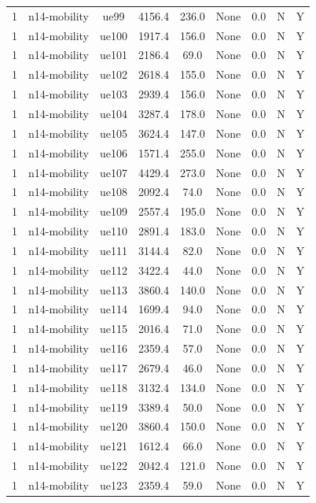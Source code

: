 \begin{table}[ht]
\begin{tabular}{|c|c|c|c|c|c|c|c|c|}
1 & n14-mobility & ue99 & 4156.4 & 236.0 & None & 0.0 & N & Y \\
1 & n14-mobility & ue100 & 1917.4 & 156.0 & None & 0.0 & N & Y \\
1 & n14-mobility & ue101 & 2186.4 & 69.0 & None & 0.0 & N & Y \\
1 & n14-mobility & ue102 & 2618.4 & 155.0 & None & 0.0 & N & Y \\
1 & n14-mobility & ue103 & 2939.4 & 156.0 & None & 0.0 & N & Y \\
1 & n14-mobility & ue104 & 3287.4 & 178.0 & None & 0.0 & N & Y \\
1 & n14-mobility & ue105 & 3624.4 & 147.0 & None & 0.0 & N & Y \\
1 & n14-mobility & ue106 & 1571.4 & 255.0 & None & 0.0 & N & Y \\
1 & n14-mobility & ue107 & 4429.4 & 273.0 & None & 0.0 & N & Y \\
1 & n14-mobility & ue108 & 2092.4 & 74.0 & None & 0.0 & N & Y \\
1 & n14-mobility & ue109 & 2557.4 & 195.0 & None & 0.0 & N & Y \\
1 & n14-mobility & ue110 & 2891.4 & 183.0 & None & 0.0 & N & Y \\
1 & n14-mobility & ue111 & 3144.4 & 82.0 & None & 0.0 & N & Y \\
1 & n14-mobility & ue112 & 3422.4 & 44.0 & None & 0.0 & N & Y \\
1 & n14-mobility & ue113 & 3860.4 & 140.0 & None & 0.0 & N & Y \\
1 & n14-mobility & ue114 & 1699.4 & 94.0 & None & 0.0 & N & Y \\
1 & n14-mobility & ue115 & 2016.4 & 71.0 & None & 0.0 & N & Y \\
1 & n14-mobility & ue116 & 2359.4 & 57.0 & None & 0.0 & N & Y \\
1 & n14-mobility & ue117 & 2679.4 & 46.0 & None & 0.0 & N & Y \\
1 & n14-mobility & ue118 & 3132.4 & 134.0 & None & 0.0 & N & Y \\
1 & n14-mobility & ue119 & 3389.4 & 50.0 & None & 0.0 & N & Y \\
1 & n14-mobility & ue120 & 3860.4 & 150.0 & None & 0.0 & N & Y \\
1 & n14-mobility & ue121 & 1612.4 & 66.0 & None & 0.0 & N & Y \\
1 & n14-mobility & ue122 & 2042.4 & 121.0 & None & 0.0 & N & Y \\
1 & n14-mobility & ue123 & 2359.4 & 59.0 & None & 0.0 & N & Y \\

\end{tabular}
\end{table}
